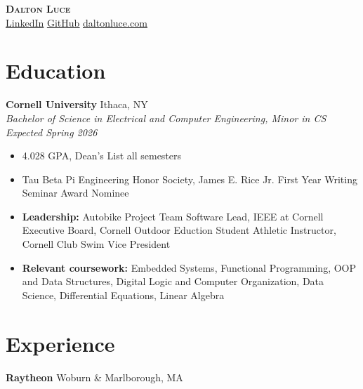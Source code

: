 \documentclass[letterpaper,10pt]{article}
\newcommand{\company}[2]{
    \vspace{6pt}
    {\large \textbf{#1}}
    \hfill
    {\normalsize {#2}}
    \\
}
\newcommand{\resumeEntry}[4]{
    \vspace{4pt}
    {\large \textbf{#1}}
    \hfill
    {\normalsize #2}
    \\
    \textit{#3} \hfill \textit{#4}
    \vspace{1pt}
}
\newcommand{\itemsBegin}{
    \begin{itemize}[leftmargin=0.2in, labelsep=0.05in, itemsep=0pt, parsep=1pt, topsep=0pt, partopsep=0pt]
}
\newcommand{\itemsEnd}{\end{itemize}}
\begin{document}
\textbf{\huge \scshape Dalton Luce} \\
\vspace{2pt}
\small
\addressConditional{}   %
\phoneConditional{}     %
\emailConditional{}     %
\href{https://www.linkedin.com/in/dalton-luce/}{\underline{LinkedIn}} %
\hspace{10pt}
\href{https://github.com/da-luce}{\underline{GitHub}}                 %
\hspace{10pt}
\href{https://daltonluce.com/}{\underline{daltonluce.com}}            %
\vspace{-5pt}

\section{Education}

    \resumeEntry{Cornell University}
        {Ithaca, NY}
        {Bachelor of Science in Electrical and Computer Engineering, Minor in CS}
        {Expected Spring 2026}

    \itemsBegin{}
        \item 4.028 GPA, Dean's List all semesters
        \item Tau Beta Pi Engineering Honor Society, James E. Rice Jr. First Year Writing Seminar Award Nominee
        \item \textbf{Leadership:} Autobike Project Team Software Lead, IEEE at Cornell Executive Board, Cornell Outdoor Eduction Student Athletic Instructor, Cornell Club Swim Vice President
        \item \textbf{Relevant coursework:} Embedded Systems, Functional Programming, OOP and Data Structures, Digital Logic and Computer Organization, Data Science, Differential Equations, Linear Algebra
    \itemsEnd{}

\section{Experience}

    \company{Raytheon}{Woburn \& Marlborough, MA}
\end{document}
